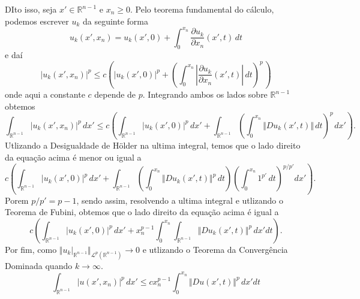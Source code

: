 \documentclass[a4paper, 11pt]{book}
\theoremstyle{definition}
\newcommand{\bR}{\mathbb{R}}
\newcommand{\cL}{\mathcal{L}}
\begin{document}
\begin{prf}
    DIto isso, seja $x' \in \bR^{n-1}$ e $x_n \geqslant 0$.
    Pelo teorema fundamental do cálculo, podemos escrever $u_k$ da seguinte forma
    \[
        u_k(x'\!,x_n) = u_k(x'\!,0) + \int_0^{x_n} \dfrac{\partial u_k}{\partial x_n} (x'\!,t) \,dt
    \]
    e daí
    \[
        |u_k(x'\!,x_n)|^p \leqslant c \left(  |u_k(x'\!,0)|^p + \left(  \int_0^{x_n} \left|\dfrac{\partial u_k}{\partial x_n} (x'\!,t)\right| \,dt\right)^{\!p\,} \right)
    \]
    onde aqui a constante $c$ depende de $p$. Integrando ambos os lados sobre $\bR^{n-1}$ obtemos
    \[
        \int_{\bR^{n-1}} |u_k(x',x_n)|^p \,dx' \leqslant c \left( \int_{\bR^{n-1}} |u_k(x',0)|^p \,dx' + \int_{\bR^{n-1}} \left(  \int_0^{x_n} \Vert Du_k(x',t) \Vert \,dt\right)^{\!p\,} dx' \right).
    \]
    Utlizando a Desigualdade de Hölder na ultima integral, temos que o lado direito da equação acima é menor ou igual a
    \[
        c \left( \int_{\bR^{n-1}} |u_k(x',0)|^p \,dx' + \int_{\bR^{n-1}} \left( \int_0^{x_n} \Vert Du_k (x',t) \Vert^p \,dt \right)\left( \int_0^{x_n} 1^{p'} \,dt \right)^{p/p'} dx'\right).
    \]
    Porem $p/p' = p-1$, sendo assim, resolvendo a ultima integral e utlizando o Teorema de Fubini, obtemos que o lado direito da equação acima é igual a
    \[
        c \left( \int_{\bR^{n-1}} |u_k(x',0)|^p \,dx' + x_n^{p-1} \int_{0}^{x_n} \int_{\bR^{n-1}} \Vert Du_k (x',t) \Vert^p  \,dx'dt \right).
    \]
    Por fim, como $\Vert u_k |_{\bR^{n-1}} \Vert_{\cL^p(\bR^{n-1})} \to 0$ e utlizando o Teorema da Convergência Dominada quando $k \to \infty$.
    \begin{equation} \label{eq:uuuuu}
        \int_{\bR^{n-1}} |u(x',x_n)|^p \,dx' \leqslant  c x_n^{p-1}\int_0^{x_n} \Vert Du(x',t) \Vert^p \,dx'dt
    \end{equation}
    

\end{prf}
\end{document}
